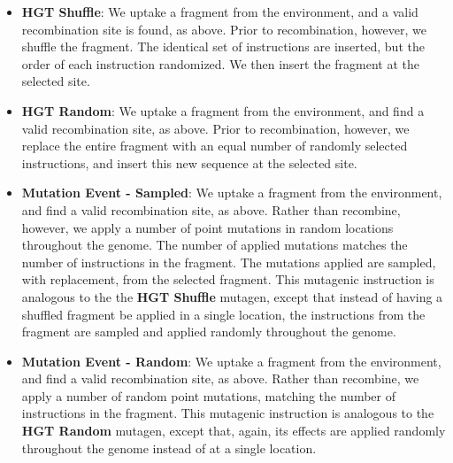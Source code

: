 \documentclass[PhD]{msu-thesis}
\begin{document}
\begin{itemize}
	\item \textbf{HGT Shuffle}: We uptake a fragment from the environment, and a valid recombination site is found, as above.
Prior to recombination, however, we shuffle the fragment.  The identical set of instructions are inserted, but the order of each instruction randomized. We then insert the fragment at the selected site.
	\item \textbf{HGT Random}: We uptake a fragment from the environment, and find a valid recombination site, as above. Prior to recombination, however, we replace the entire fragment with an equal number of randomly selected instructions, and insert this new sequence at the selected site.
	\item \textbf{Mutation Event - Sampled}: We uptake a fragment from the environment, and find a valid recombination site, as above. Rather than recombine, however, we apply a number of point mutations in random locations throughout the genome. The number of applied mutations matches the number of instructions in the fragment. The mutations applied are sampled, with replacement, from the selected fragment. This mutagenic instruction is analogous to the the \textbf{HGT Shuffle} mutagen, except that instead of having a shuffled fragment be applied in a single location, the instructions from the fragment are sampled and applied randomly throughout the genome.

	\item \textbf{Mutation Event - Random}: We uptake a fragment from the environment, and find a valid recombination site, as above. Rather than recombine, we apply a number of random point mutations, matching the number of instructions in the fragment. This mutagenic instruction is analogous to the \textbf{HGT Random} mutagen, except that, again, its effects are applied randomly throughout the genome instead of at a single location.


\end{itemize}
\end{document}
